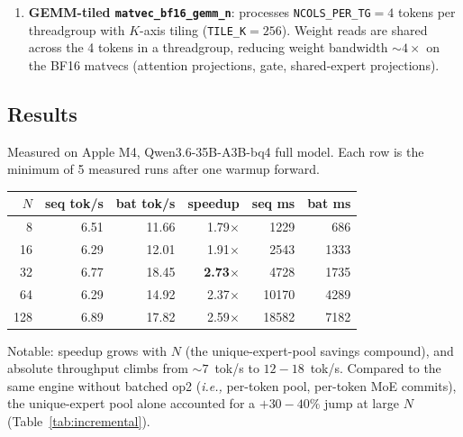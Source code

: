 \documentclass[11pt,a4paper]{article}
\begin{document}
\begin{enumerate}
    \emph{unique} experts in the batch (up to $E$) are pre-read once
    each, then multiple tokens' \texttt{Routing.expert\_data} clones
    point to the same pool slot. For random routing at $N{=}128,
    K{=}8, E{=}256$: $\sim 200\!-\!256$ unique vs 1024 pre-reads.
    Memory cost: $E \cdot S_{\text{expert}} \approx 450$~MB on
    Qwen3.6.
\item \textbf{GEMM-tiled \texttt{matvec\_bf16\_gemm\_n}}: processes
    \texttt{NCOLS\_PER\_TG}${=}4$ tokens per threadgroup with $K$-axis
    tiling (\texttt{TILE\_K}${=}256$). Weight reads are shared
    across the 4 tokens in a threadgroup, reducing weight bandwidth
    $\sim 4\times$ on the BF16 matvecs (attention projections, gate,
    shared-expert projections).
\end{enumerate}

\subsection{Results}

Measured on Apple M4, Qwen3.6-35B-A3B-bq4 full model. Each row is
the minimum of 5 measured runs after one warmup forward.

\begin{center}
\begin{tabular}{rrrrrr}
\toprule
$N$ & seq tok/s & bat tok/s & speedup & seq ms & bat ms \\
\midrule
8   & 6.51  & 11.66 & 1.79$\times$ & 1229  & 686   \\
16  & 6.29  & 12.01 & 1.91$\times$ & 2543  & 1333  \\
32  & 6.77  & 18.45 & \textbf{2.73}$\times$ & 4728  & 1735  \\
64  & 6.29  & 14.92 & 2.37$\times$ & 10170 & 4289  \\
128 & 6.89  & 17.82 & 2.59$\times$ & 18582 & 7182  \\
\bottomrule
\end{tabular}
\end{center}

Notable: speedup grows with $N$ (the unique-expert-pool savings
compound), and absolute throughput climbs from $\sim 7$~tok/s to
$12\!-\!18$~tok/s. Compared to the same engine without batched op2
(\textit{i.e.,} per-token pool, per-token MoE commits), the
unique-expert pool alone accounted for a $+30\!-\!40\%$ jump at large
$N$ (Table~\ref{tab:incremental}).
\end{document}
